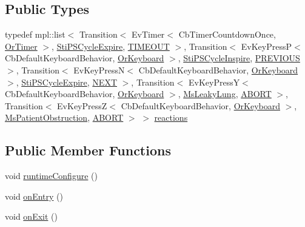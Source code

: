 \subsection*{Public Types}
\begin{DoxyCompactItemize}
\item 
typedef mpl\+::list$<$ Transition$<$ Ev\+Timer$<$ Cb\+Timer\+Countdown\+Once, \hyperlink{classsm__respira__1_1_1OrTimer}{Or\+Timer} $>$, \hyperlink{structsm__respira__1_1_1cmv__cycle__inner__states_1_1StiPSCycleExpire}{Sti\+P\+S\+Cycle\+Expire}, \hyperlink{structsm__respira__1_1_1cmv__cycle__inner__states_1_1StiPSCyclePlateau_1_1TIMEOUT}{T\+I\+M\+E\+O\+UT} $>$, Transition$<$ Ev\+Key\+PressP$<$ Cb\+Default\+Keyboard\+Behavior, \hyperlink{classsm__respira__1_1_1OrKeyboard}{Or\+Keyboard} $>$, \hyperlink{structsm__respira__1_1_1cmv__cycle__inner__states_1_1StiPSCycleInspire}{Sti\+P\+S\+Cycle\+Inspire}, \hyperlink{structsm__respira__1_1_1cmv__cycle__inner__states_1_1StiPSCyclePlateau_1_1PREVIOUS}{P\+R\+E\+V\+I\+O\+US} $>$, Transition$<$ Ev\+Key\+PressN$<$ Cb\+Default\+Keyboard\+Behavior, \hyperlink{classsm__respira__1_1_1OrKeyboard}{Or\+Keyboard} $>$, \hyperlink{structsm__respira__1_1_1cmv__cycle__inner__states_1_1StiPSCycleExpire}{Sti\+P\+S\+Cycle\+Expire}, \hyperlink{structsm__respira__1_1_1cmv__cycle__inner__states_1_1StiPSCyclePlateau_1_1NEXT}{N\+E\+XT} $>$, Transition$<$ Ev\+Key\+PressY$<$ Cb\+Default\+Keyboard\+Behavior, \hyperlink{classsm__respira__1_1_1OrKeyboard}{Or\+Keyboard} $>$, \hyperlink{classsm__respira__1_1_1MsLeakyLung}{Ms\+Leaky\+Lung}, \hyperlink{classABORT}{A\+B\+O\+RT} $>$, Transition$<$ Ev\+Key\+PressZ$<$ Cb\+Default\+Keyboard\+Behavior, \hyperlink{classsm__respira__1_1_1OrKeyboard}{Or\+Keyboard} $>$, \hyperlink{classsm__respira__1_1_1MsPatientObstruction}{Ms\+Patient\+Obstruction}, \hyperlink{classABORT}{A\+B\+O\+RT} $>$ $>$ \hyperlink{structsm__respira__1_1_1cmv__cycle__inner__states_1_1StiPSCyclePlateau_a01fe99a411c05403770fdc1005a9073a}{reactions}
\end{DoxyCompactItemize}
\subsection*{Public Member Functions}
\begin{DoxyCompactItemize}
\item 
void \hyperlink{structsm__respira__1_1_1cmv__cycle__inner__states_1_1StiPSCyclePlateau_a9200a4f198aec854f083c72cc236dc09}{runtime\+Configure} ()
\item 
void \hyperlink{structsm__respira__1_1_1cmv__cycle__inner__states_1_1StiPSCyclePlateau_a4d199f818afcfd88c0593aae82ad4583}{on\+Entry} ()
\item 
void \hyperlink{structsm__respira__1_1_1cmv__cycle__inner__states_1_1StiPSCyclePlateau_a311b3780637be1c770f2523cda302411}{on\+Exit} ()
\end{DoxyCompactItemize}
